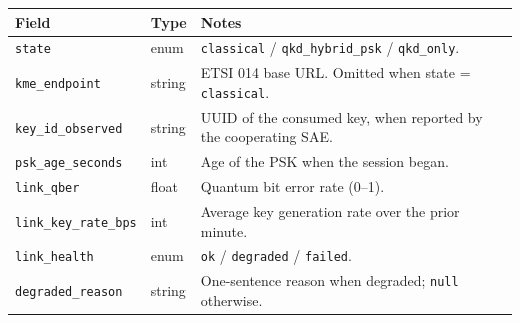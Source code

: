 \begin{Shaded}
\begin{Highlighting}[]
\FunctionTok{\{}
  \FunctionTok{:} \FunctionTok{,}
  \FunctionTok{:} \FunctionTok{,}
  \FunctionTok{:} \FunctionTok{,}
  \FunctionTok{:} \FunctionTok{,}
  \FunctionTok{:} \FunctionTok{,}
  \FunctionTok{:} \FunctionTok{,}
  \FunctionTok{:} \FunctionTok{,}
  \FunctionTok{:} 
\FunctionTok{\}}
\end{Highlighting}
\end{Shaded}

\begin{longtable}[]{@{}
  >{\raggedright\arraybackslash}p{}
  >{\raggedright\arraybackslash}p{}
  >{\raggedright\arraybackslash}p{}@{}}
\toprule\noalign{}
\begin{minipage}[b]{\linewidth}\raggedright
Field
\end{minipage} & \begin{minipage}[b]{\linewidth}\raggedright
Type
\end{minipage} & \begin{minipage}[b]{\linewidth}\raggedright
Notes
\end{minipage} \\
\midrule\noalign{}
\endhead
\bottomrule\noalign{}
\endlastfoot
\texttt{state} & enum & \texttt{classical} / \texttt{qkd\_hybrid\_psk} /
\texttt{qkd\_only}. \\
\texttt{kme\_endpoint} & string & ETSI 014 base URL. Omitted when state
= \texttt{classical}. \\
\texttt{key\_id\_observed} & string & UUID of the consumed key, when
reported by the cooperating SAE. \\
\texttt{psk\_age\_seconds} & int & Age of the PSK when the session
began. \\
\texttt{link\_qber} & float & Quantum bit error rate (0--1). \\
\texttt{link\_key\_rate\_bps} & int & Average key generation rate over
the prior minute. \\
\texttt{link\_health} & enum & \texttt{ok} / \texttt{degraded} /
\texttt{failed}. \\
\texttt{degraded\_reason} & string & One-sentence reason when degraded;
\texttt{null} otherwise. \\
\end{longtable}

